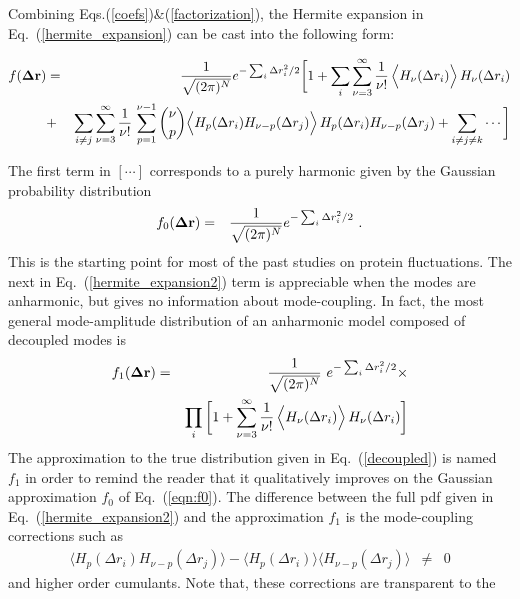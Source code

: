 \documentclass[prl,nofootinbib,twocolumn,floatfix,showpacs]{revtex4}
\begin{document}
Combining Eqs.(\ref{coefs})\&(\ref{factorization}), the Hermite
expansion in Eq.~(\ref{hermite_expansion}) can be cast into the
following form:
\begin{widetext}
\begin{eqnarray}
\label{hermite_expansion2}
f({\bf\Delta r}) &=& \frac{1}{\sqrt{(2\pi)^N}} e^{ -\sum_i \Delta
  r_i^2/2} \bigg[ 1 + \sum_i\sum_{\nu=3}^\infty
  \frac{1}{\nu!}\, \Big\langle
  H_\nu(\Delta r_i)\Big\rangle\,H_\nu(\Delta r_i) \nonumber \\
&+&  \sum_{i\ne j}\sum_{\nu=3}^\infty
  \frac{1}{\nu!}\,\sum_{p=1}^{\nu-1} {\nu\choose p} \Big\langle
  H_p(\Delta r_i)H_{\nu-p}(\Delta r_j)\Big\rangle\,H_p(\Delta r_i)H_{\nu-p}(\Delta r_j) + \sum_{i\ne j\ne k} \cdots \bigg]
\end{eqnarray}
\end{widetext}
The first term in $[\cdots]$ corresponds to a purely harmonic given by
the Gaussian probability distribution
\begin{eqnarray}
\label{eqn:f0}
f_0({\bf\Delta r}) &=& \frac{1}{\sqrt{(2\pi)^N}} e^{ -\sum_i \Delta
  r_i^2/2}\ .
\end{eqnarray}
This is the starting point for most of the past studies on protein
fluctuations\cite{?}. The next in Eq.~(\ref{hermite_expansion2}) term is
appreciable when the modes are anharmonic, but gives no information
about mode-coupling. In fact, the most general mode-amplitude
distribution of an anharmonic model composed of decoupled modes is
\begin{eqnarray}
\label{decoupled}
f_1({\bf\Delta r}) &=& \frac{1}{\sqrt{(2\pi)^N}}\ e^{ -\sum_i \Delta
  r_i^2/2} \times \nonumber \\
&& \prod_i\bigg[ 1 + \sum_{\nu=3}^\infty
  \frac{1}{\nu!}\, \Big\langle
  H_\nu(\Delta r_i)\Big\rangle\,H_\nu(\Delta r_i)\bigg]
\end{eqnarray}
The approximation to the true distribution given in
Eq.~(\ref{decoupled}) is named $f_1$ in order to remind the reader
that it qualitatively improves on the Gaussian approximation $f_0$
of Eq.~(\ref{eqn:f0}). The difference between the full pdf given in
Eq.~(\ref{hermite_expansion2}) and the approximation $f_1$ is the
mode-coupling corrections such as
\begin{eqnarray}
\langle H_p(\Delta r_i)H_{\nu-p}(\Delta r_j)\rangle - \langle
H_p(\Delta r_i)\rangle\langle H_{\nu-p}(\Delta r_j)\rangle &\neq& 0 \nonumber
\end{eqnarray}
and higher order cumulants. Note that, these corrections are transparent to the
\end{document}
